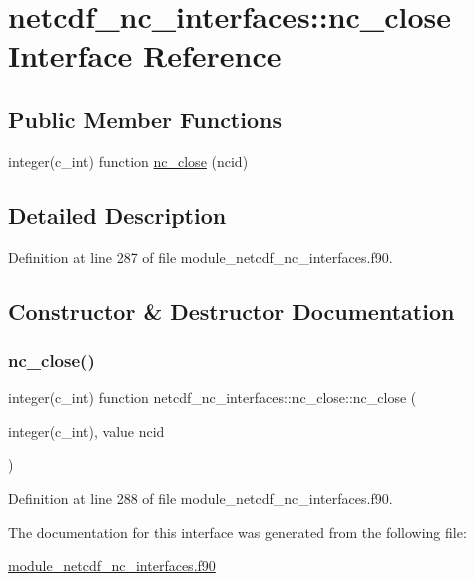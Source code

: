 \hypertarget{interfacenetcdf__nc__interfaces_1_1nc__close}{}\section{netcdf\+\_\+nc\+\_\+interfaces\+:\+:nc\+\_\+close Interface Reference}
\label{interfacenetcdf__nc__interfaces_1_1nc__close}
\subsection*{Public Member Functions}
\begin{DoxyCompactItemize}
\item 
integer(c\+\_\+int) function \hyperlink{interfacenetcdf__nc__interfaces_1_1nc__close_a7c33dbd4ef1424ac9e8d3b77da6423c5}{nc\+\_\+close} (ncid)
\end{DoxyCompactItemize}


\subsection{Detailed Description}


Definition at line 287 of file module\+\_\+netcdf\+\_\+nc\+\_\+interfaces.\+f90.



\subsection{Constructor \& Destructor Documentation}
\mbox{\label{interfacenetcdf__nc__interfaces_1_1nc__close_a7c33dbd4ef1424ac9e8d3b77da6423c5}} 
\subsubsection{\texorpdfstring{nc\+\_\+close()}{nc\_close()}}
{\footnotesize\ttfamily integer(c\+\_\+int) function netcdf\+\_\+nc\+\_\+interfaces\+::nc\+\_\+close\+::nc\+\_\+close (\begin{DoxyParamCaption}\item[{integer(c\+\_\+int), value}]{ncid }\end{DoxyParamCaption})}



Definition at line 288 of file module\+\_\+netcdf\+\_\+nc\+\_\+interfaces.\+f90.



The documentation for this interface was generated from the following file\+:\begin{DoxyCompactItemize}
\item 
\hyperlink{module__netcdf__nc__interfaces_8f90}{module\+\_\+netcdf\+\_\+nc\+\_\+interfaces.\+f90}\end{DoxyCompactItemize}
